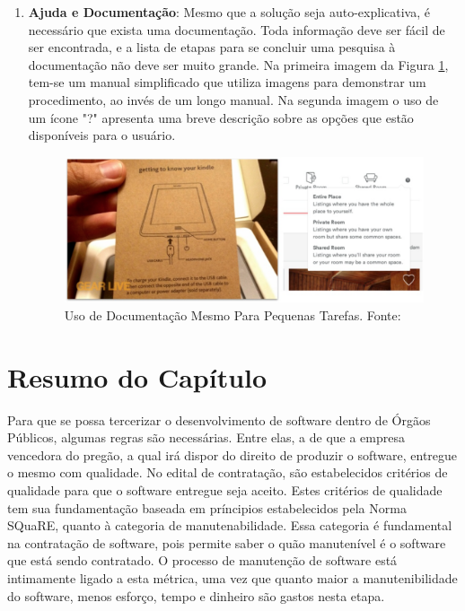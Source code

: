 \begin{enumerate}
  \item\textbf{Ajuda e Documentação}: Mesmo que a solução seja auto-explicativa, é necessário que exista uma documentação. Toda informação deve ser fácil de ser encontrada, e a lista de etapas para se concluir uma pesquisa à documentação não deve ser muito grande. Na primeira imagem da Figura \ref{img:princ10}, tem-se um manual simplificado que utiliza imagens para demonstrar um procedimento, ao invés de um longo manual. Na segunda imagem o uso de um ícone "?"  apresenta uma breve descrição sobre as opções que estão disponíveis para o usuário.
   \graphicspath{{figuras/}}
  \begin{figure}[h!]
  \centering
  \includegraphics[scale=0.50]{princ_10.png}
  \caption{Uso de Documentação Mesmo Para Pequenas Tarefas. Fonte: \cite{pres_usabilidade}}
  \label{img:princ10}
  \end{figure}
  
  \end{enumerate}  


\section{Resumo do Capítulo}
Para que se possa tercerizar o desenvolvimento de software dentro de Órgãos Públicos, algumas regras são necessárias. Entre elas, a de que a empresa vencedora do pregão, a qual irá dispor do direito de produzir o software, entregue o mesmo com qualidade. No edital de contratação, são estabelecidos critérios de qualidade para que o software entregue seja aceito. Estes critérios de qualidade tem sua fundamentação baseada em príncipios estabelecidos pela Norma SQuaRE, quanto à categoria de manutenabilidade. Essa categoria é fundamental na contratação de software, pois permite saber o quão manutenível é o software que está sendo contratado. O processo de manutenção de software está intimamente ligado a esta métrica, uma vez que quanto maior a manutenibilidade do software, menos esforço, tempo e dinheiro são gastos nesta etapa.

